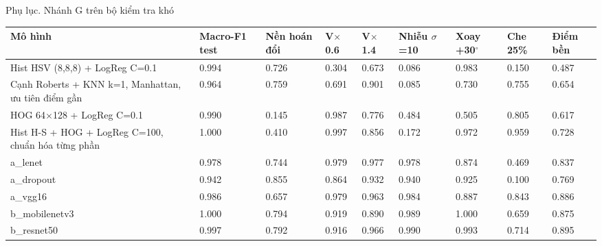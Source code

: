 \documentclass[aspectratio=169,10pt]{beamer}
\begin{document}
\begin{frame}{Phụ lục. Nhánh G trên bộ kiểm tra khó}
\begin{center}\begin{adjustbox}{max width=\linewidth,max totalheight=0.74\textheight}
\begin{tabular}{lllllllll}\toprule
\textbf{Mô hình} & \textbf{Macro-F1 test} & \textbf{Nền hoán đổi} & \textbf{V$\times$0.6} & \textbf{V$\times$1.4} & \textbf{Nhiễu $\sigma$=10} & \textbf{Xoay +30$^\circ$} & \textbf{Che 25\%} & \textbf{Điểm bền} \\ \midrule
Hist HSV (8,8,8) + LogReg C=0.1 & 0.994 & 0.726 & 0.304 & 0.673 & 0.086 & 0.983 & 0.150 & 0.487 \\
Cạnh Roberts + KNN k=1, Manhattan, ưu tiên điểm gần & 0.964 & 0.759 & 0.691 & 0.901 & 0.085 & 0.730 & 0.755 & 0.654 \\
HOG 64$\times$128 + LogReg C=0.1 & 0.990 & 0.145 & 0.987 & 0.776 & 0.484 & 0.505 & 0.805 & 0.617 \\
Hist H-S + HOG + LogReg C=100, chuẩn hóa từng phần & 1.000 & 0.410 & 0.997 & 0.856 & 0.172 & 0.972 & 0.959 & 0.728 \\
a\_lenet & 0.978 & 0.744 & 0.979 & 0.977 & 0.978 & 0.874 & 0.469 & 0.837 \\
a\_dropout & 0.942 & 0.855 & 0.864 & 0.932 & 0.940 & 0.925 & 0.100 & 0.769 \\
a\_vgg16 & 0.986 & 0.657 & 0.979 & 0.963 & 0.984 & 0.887 & 0.843 & 0.886 \\
b\_mobilenetv3 & 1.000 & 0.794 & 0.919 & 0.890 & 0.989 & 1.000 & 0.659 & 0.875 \\
b\_resnet50 & 0.997 & 0.792 & 0.916 & 0.966 & 0.990 & 0.993 & 0.714 & 0.895 \\
\bottomrule\end{tabular}
\end{adjustbox}\end{center}
\end{frame}
\end{document}
